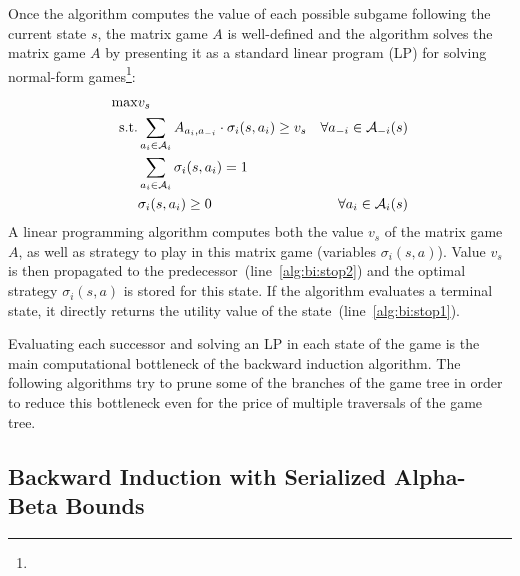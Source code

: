 Once the algorithm computes the value of each possible subgame following the current state $s$, the matrix game $A$ is well-defined and the algorithm
solves the matrix game $A$ by presenting it as a standard linear program (LP) for solving normal-form games\footnote{}:
\begin{eqnarray}
\max & v_s & \\
\textrm{s.t.} & \sum_{a_i \in \mathcal{A}_{i}}A_{a_i,a_{-i}} \cdot \sigma_i(s,a_i) \geq v_s & \forall a_{-i} \in \mathcal{A}_{-i}(s)\\
& \sum_{a_{i} \in \mathcal{A}_{i}} \sigma_i(s,a_{i}) = 1 \\
& \sigma_i(s,a_{i}) \geq 0 & \forall a_{i} \in \mathcal{A}_{i}(s)
\end{eqnarray}
A linear programming algorithm computes both the value $v_s$ of the matrix game $A$, as well as strategy to play in this matrix game (variables $\sigma_i(s,a)$).
Value $v_s$ is then propagated to the predecessor~(line~\ref{alg:bi:stop2}) and the optimal strategy $\sigma_i(s,a)$ is stored for this state.
If the algorithm evaluates a terminal state, it directly returns the utility value of the state~(line~\ref{alg:bi:stop1}).

Evaluating each successor and solving an LP in each state of the game is the main computational bottleneck of the backward induction algorithm.
The following algorithms try to prune some of the branches of the game tree in order to reduce this bottleneck even for the price of multiple traversals of the game tree.

\subsection{Backward Induction with Serialized Alpha-Beta Bounds}\label{sec:algs:biab}

